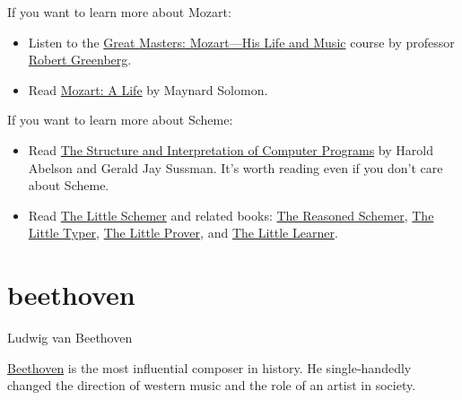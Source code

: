\documentclass{article}
\begin{document}
If you want to learn more about Mozart:
\begin{itemize}
    \item
    Listen to the \href{https://www.thegreatcourses.com/courses/great-masters-mozart-his-life-and-music}{Great Masters: Mozart---His Life and Music} course by professor \href{https://robertgreenbergmusic.com/}{Robert Greenberg}.
    \item
    Read \href{https://www.amazon.com/Mozart-Life-Maynard-Solomon/dp/0060883448}{Mozart: A Life} by Maynard Solomon.
\end{itemize}

If you want to learn more about Scheme:
\begin{itemize}
    \item
    Read \href{https://mitpress.mit.edu/9780262510875/structure-and-interpretation-of-computer-programs/}{The Structure and Interpretation of Computer Programs} by Harold Abelson and Gerald Jay Sussman.
    It's worth reading even if you don't care about Scheme.
    \item
    Read \href{https://www.amazon.com/Little-Schemer-Daniel-P-Friedman/dp/0262560992/}{The Little Schemer} and related books: \href{https://www.amazon.com/Reasoned-Schemer-MIT-Press/dp/0262535513/}{The Reasoned Schemer}, \href{https://www.amazon.com/Little-Typer-MIT-Press/dp/0262536439/}{The Little Typer}, \href{https://www.amazon.com/Little-Prover-MIT-Press/dp/0262527952/}{The Little Prover}, and \href{https://www.amazon.com/Little-Learner-Straight-Line-Learning/dp/026254637X/}{The Little Learner}.
\end{itemize}

\section{beethoven}{Ludwig van Beethoven}

\href{https://en.wikipedia.org/wiki/Ludwig_van_Beethoven}{Beethoven} is the most influential composer in history.
He single-handedly changed the direction of western music and the role of an artist in society.
\end{document}
